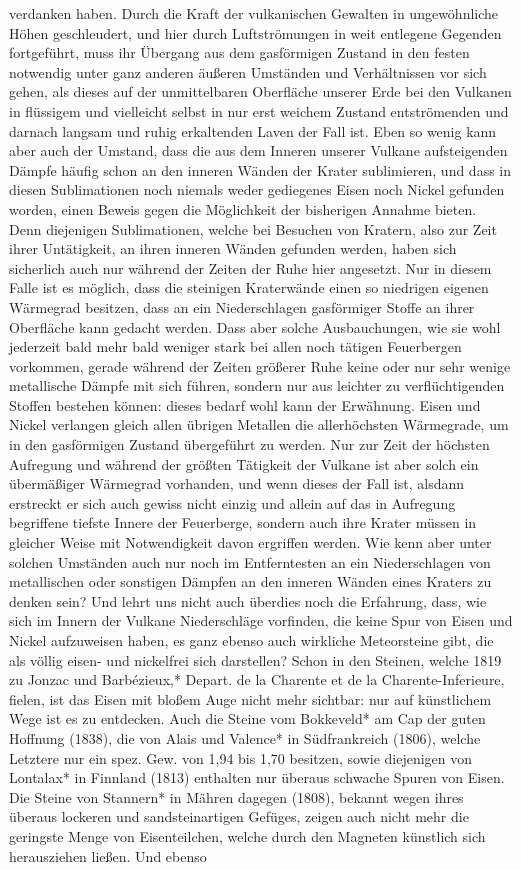 \documentclass[a4paper, 11pt, oneside, polutonikogreek, german]{article}
\begin{document}
verdanken haben. Durch die Kraft der vulkanischen Gewalten in ungewöhnliche Höhen geschleudert, und hier durch Luftströmungen in weit entlegene Gegenden fortgeführt, muss ihr Übergang aus dem gasförmigen Zustand in den festen notwendig unter ganz anderen äußeren Umständen und Verhältnissen vor sich gehen, als dieses auf der unmittelbaren Oberfläche unserer Erde bei den Vulkanen in flüssigem und vielleicht selbst in nur erst weichem Zustand entströmenden und darnach langsam und ruhig erkaltenden Laven der Fall ist. Eben so wenig kann aber auch der Umstand, dass die aus dem Inneren unserer Vulkane aufsteigenden Dämpfe häufig schon an den inneren Wänden der Krater sublimieren, und dass in diesen Sublimationen noch niemals weder gediegenes Eisen noch Nickel gefunden worden, einen Beweis gegen die Möglichkeit der bisherigen Annahme bieten. Denn diejenigen Sublimationen, welche bei Besuchen von Kratern, also zur Zeit ihrer Untätigkeit, an ihren inneren Wänden gefunden werden, haben sich sicherlich auch nur während der Zeiten der Ruhe hier angesetzt. Nur in diesem Falle ist es möglich, dass die steinigen Kraterwände einen so niedrigen eigenen Wärmegrad besitzen, dass an ein Niederschlagen gasförmiger Stoffe an ihrer Oberfläche kann gedacht werden. Dass aber solche Ausbauchungen, wie sie wohl jederzeit bald mehr bald weniger stark bei allen noch tätigen Feuerbergen vorkommen, gerade während der Zeiten größerer Ruhe keine oder nur sehr wenige metallische Dämpfe mit sich führen, sondern nur aus leichter zu verflüchtigenden Stoffen bestehen können: dieses bedarf wohl kann der Erwähnung. Eisen und Nickel verlangen gleich allen übrigen Metallen die allerhöchsten Wärmegrade, um in den gasförmigen Zustand übergeführt zu werden. Nur zur Zeit der höchsten Aufregung und während der größten Tätigkeit der Vulkane ist aber solch ein übermäßiger Wärmegrad vorhanden, und wenn dieses der Fall ist, alsdann erstreckt er sich auch gewiss nicht einzig und allein auf das in Aufregung begriffene tiefste Innere der Feuerberge, sondern auch ihre Krater müssen in gleicher Weise mit Notwendigkeit davon ergriffen werden. Wie kenn aber unter solchen Umständen auch nur noch im Entferntesten an ein Niederschlagen von metallischen oder sonstigen Dämpfen an den inneren Wänden eines Kraters zu denken sein? Und lehrt uns nicht auch überdies noch die Erfahrung, dass, wie sich im Innern der Vulkane Niederschläge vorfinden, die keine Spur von Eisen und Nickel aufzuweisen haben, es ganz ebenso auch wirkliche Meteorsteine gibt, die als völlig eisen- und nickelfrei sich darstellen? Schon in den Steinen, welche 1819 zu Jonzac und Barbézieux,* Depart. de la Charente et de la Charente-Inferieure, fielen, ist das Eisen mit bloßem Auge nicht mehr sichtbar: nur auf künstlichem Wege ist es zu entdecken. Auch die Steine vom Bokkeveld* am Cap der guten Hoffnung (1838), die von Alais und Valence* in Südfrankreich (1806), welche Letztere nur ein spez. Gew. von 1,94 bis 1,70 besitzen, sowie diejenigen von Lontalax* in Finnland (1813) enthalten nur überaus schwache Spuren von Eisen. Die Steine von Stannern* in Mähren dagegen (1808), bekannt wegen ihres überaus lockeren und sandsteinartigen Gefüges, zeigen auch nicht mehr die geringste Menge von Eisenteilchen, welche durch den Magneten künstlich sich herausziehen ließen. Und ebenso 
\end{document}
